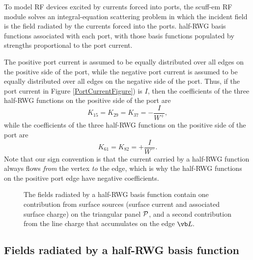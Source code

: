 \documentclass[letterpaper]{article}
\begin{document}
To model RF devices excited by currents forced into ports,
the {\sc scuff-em} RF module solves an integral-equation scattering problem
in which the incident field is the field radiated by the currents
forced into the ports.
half-RWG basis
functions associated 
with each port, with those basis functions populated by strengths
proportional to the port current.

The positive port current is assumed to be equally distributed over 
all edges on the positive side of the port, while the 
negative port current is assumed to be equally distributed over 
all edges on the negative side of the port.
Thus, if the port current in Figure \ref{PortCurrentFigure}) is $I$, 
then the coefficients of the three half-RWG functions on the 
positive side of the port are
$$K_{15}=K_{29}=K_{37}=-\frac{I}{W^+},$$
while the coefficients of the three half-RWG functions on the 
positive side of the port are
$$K_{61}=K_{82}=+\frac{I}{W^-}.$$
Note that our sign convention is that the current carried
by a half-RWG function always flows \textit{from} the vertex 
\textit{to} the edge, which is why the half-RWG functions
on the positive port edge have negative coefficients.

\begin{figure}
\begin{center}
\caption{The fields radiated by a half-RWG basis function
         contain one contribution from surface sources 
         (surface current and associated surface charge)
         on the triangular panel $\mathcal{P}$, and a second contribution
         from the line charge that accumulates on the edge 
         $\vb L.$
        }
\label{HalfRWGBasisFunction}
\end{center}
\end{figure}

\subsection*{Fields radiated by a half-RWG basis function}
\end{document}
